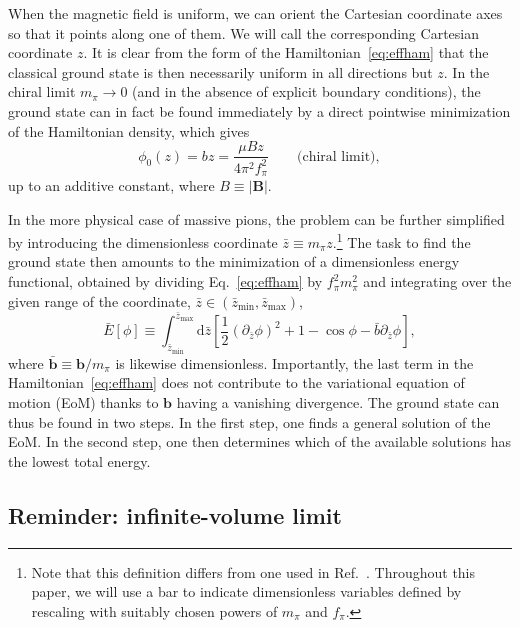\documentclass[pdflatex,iicol,sn-mathphys-num]{sn-jnl}
\let\m=\mu
\let\p=\phi
\let\de=\partial
\newcommand{\dd}{\text{d}}%
\newcommand{\vek}[1]{\bm{#1}}%
\newcommand{\bmag}{b}%
\begin{document}
When the magnetic field is uniform, we can orient the Cartesian coordinate axes so that it points along one of them. We will call the corresponding Cartesian coordinate $z$. It is clear from the form of the Hamiltonian~\eqref{eq:effham} that the classical ground state is then necessarily uniform in all directions but $z$. In the chiral limit $m_\pi\to0$ (and in the absence of explicit boundary conditions), the ground state can in fact be found immediately by a direct pointwise minimization of the Hamiltonian density, which gives
\begin{equation}
\p_0(z)=\bmag z=\frac{\m Bz}{4\pi^2f_\pi^2}\qquad\text{(chiral limit)},
\label{eq:vacuniformchiral}
\end{equation}
up to an additive constant, where $B\equiv|\vek B|$.

In the more physical case of massive pions, the problem can be further simplified by introducing the dimensionless coordinate $\bar z\equiv m_\pi z$.\footnote{Note that this definition differs from one used in Ref.~\cite{Brauner:2016pko}. Throughout this paper, we will use a bar to indicate dimensionless variables defined by rescaling with suitably chosen powers of $m_\pi$ and $f_\pi$.} The task to find the ground state then amounts to the minimization of a dimensionless energy functional, obtained by dividing Eq.~\eqref{eq:effham} by $f_\pi^2m_\pi^2$ and integrating over the given range of the coordinate, $\bar z\in(\bar z_\text{min},\bar z_\text{max})$,
\begin{equation}
\bar E[\p]\equiv\int_{\bar z_\text{min}}^{\bar z_\text{max}}\dd\bar z\left[\frac12(\de_{\bar z}\p)^2+1-\cos\p-\bar\bmag\de_{\bar z}\p\right],
\label{eq:dimlessE}
\end{equation}
where $\bar{\vek\bmag}\equiv\vek\bmag/m_\pi$ is likewise dimensionless. Importantly, the last term in the Hamiltonian~\eqref{eq:effham} does not contribute to the variational equation of motion (EoM) thanks to $\vek\bmag$ having a vanishing divergence. The ground state can thus be found in two steps. In the first step, one finds a general solution of the EoM. In the second step, one then determines which of the available solutions has the lowest total energy.


\subsection{Reminder: infinite-volume limit}
\label{subsec:uniformBreminder}
\end{document}
